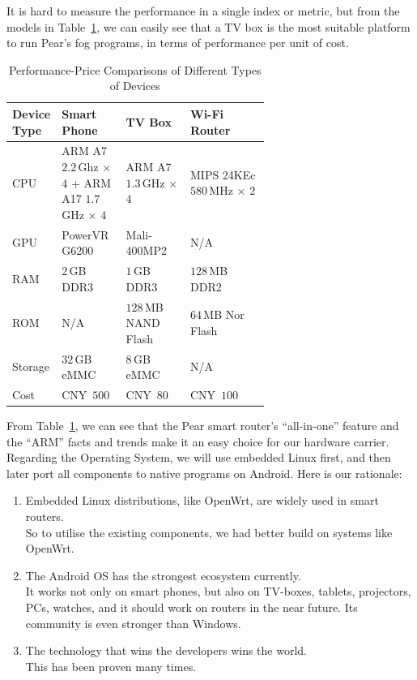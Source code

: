 It is hard to measure the performance in a single index or metric, but from the models in Table~\ref{tb:device-comparision}, we can easily see that a TV box is the most suitable platform to run Pear's fog programs, in terms of performance per unit of cost.  

\begin{table}[htb]
	\small
	\centering
	\caption{Performance-Price Comparisons of Different Types of Devices}\label{tb:device-comparision}
	\begin{tabular}{p{0.13\linewidth}p{0.25\linewidth}p{0.25\linewidth}l}
		\toprule
		Device Type & Smart Phone & TV Box & Wi-Fi Router \\
		\midrule   %
		CPU & \parbox[t]{8cm}{ARM A7 $2.2$\,Ghz $\times$ $4$ + \\ARM A17 $1.7$\,GHz $\times$ $4$} & ARM A7 $1.3$\,GHz $\times$ $4$ & MIPS 24KEc $580$\,MHz $\times$ $2$\\
		GPU & PowerVR G6200 & Mali-400MP2 & N/A\\
		RAM & $2$\,GB DDR3 & $1$\,GB DDR3 & $128$\,MB DDR2\\
		ROM & N/A & $128$\,MB NAND Flash& $64$\,MB Nor Flash\\
		Storage & $32$\,GB eMMC & $8$\,GB eMMC & N/A\\
		Cost & CNY~$500$ & CNY~$80$  & CNY~$100$\\
		\bottomrule
	\end{tabular}
\end{table}

From Table~\ref{tb:device-comparision}, we can see that the Pear smart router's ``all-in-one'' feature and the ``ARM'' facts and trends make it an easy choice for our hardware carrier. Regarding the Operating System, we will use embedded Linux first, and then later port all components to native programs on Android. Here is our rationale:
\begin{enumerate}
	\item Embedded Linux distributions, like OpenWrt, are widely used in smart routers.\\
	So to utilise the existing components, we had better build on systems like OpenWrt.
	\item The Android OS has the strongest ecosystem currently.\\
	It works not only on smart phones, but also on TV-boxes, tablets, projectors, PCs, watches, and it should work on routers in the near future. Its community is even stronger than Windows. 
	\item The technology that wins the developers wins the world.\\
	This has been proven many times. 
\end{enumerate}

